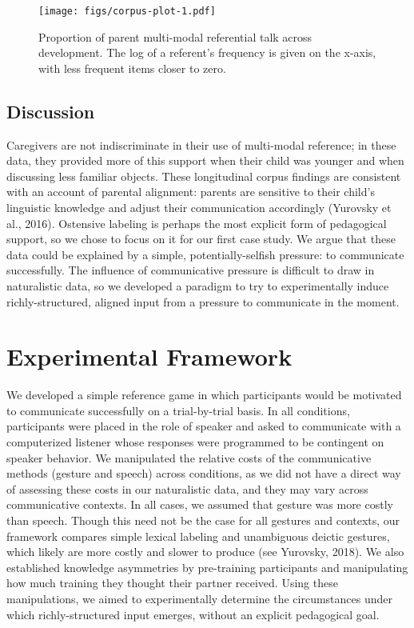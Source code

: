 \documentclass[english,,man,floatsintext]{apa6}
\begin{document}
\begin{figure}
\centering
\texttt{[image: figs/corpus-plot-1.pdf]}
\caption{\label{fig:corpus-plot}Proportion of parent multi-modal referential talk across development. The log of a referent's frequency is given on the x-axis, with less frequent items closer to zero.}
\end{figure}

\hypertarget{discussion}{%
\subsection{Discussion}\label{discussion}}

Caregivers are not indiscriminate in their use of multi-modal reference; in these data, they provided more of this support when their child was younger and when discussing less familiar objects. These longitudinal corpus findings are consistent with an account of parental alignment: parents are sensitive to their child's linguistic knowledge and adjust their communication accordingly (Yurovsky et al., 2016). Ostensive labeling is perhaps the most explicit form of pedagogical support, so we chose to focus on it for our first case study. We argue that these data could be explained by a simple, potentially-selfish pressure: to communicate successfully. The influence of communicative pressure is difficult to draw in naturalistic data, so we developed a paradigm to try to experimentally induce richly-structured, aligned input from a pressure to communicate in the moment.

\hypertarget{experimental-framework}{%
\section{Experimental Framework}\label{experimental-framework}}

We developed a simple reference game in which participants would be motivated to communicate successfully on a trial-by-trial basis. In all conditions, participants were placed in the role of speaker and asked to communicate with a computerized listener whose responses were programmed to be contingent on speaker behavior. We manipulated the relative costs of the communicative methods (gesture and speech) across conditions, as we did not have a direct way of assessing these costs in our naturalistic data, and they may vary across communicative contexts. In all cases, we assumed that gesture was more costly than speech. Though this need not be the case for all gestures and contexts, our framework compares simple lexical labeling and unambiguous deictic gestures, which likely are more costly and slower to produce (see Yurovsky, 2018). We also established knowledge asymmetries by pre-training participants and manipulating how much training they thought their partner received. Using these manipulations, we aimed to experimentally determine the circumstances under which richly-structured input emerges, without an explicit pedagogical goal.
\end{document}
